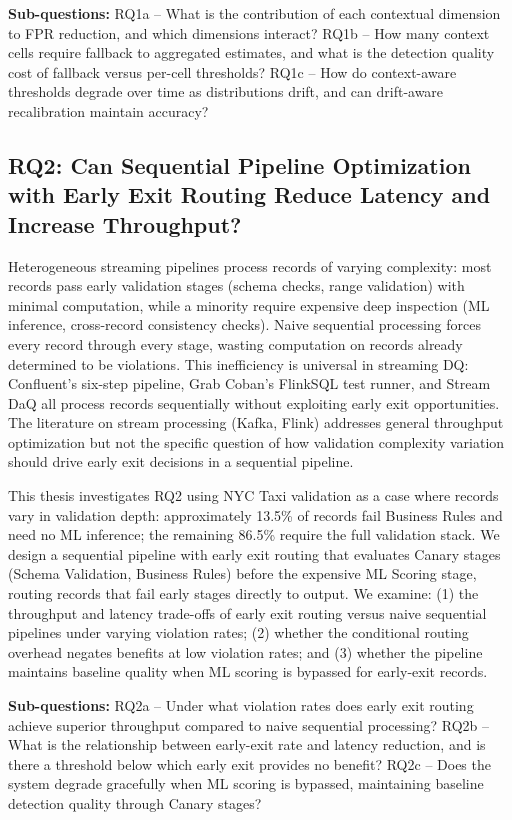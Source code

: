 \textbf{Sub-questions:} RQ1a -- What is the contribution of each contextual dimension to FPR reduction, and which dimensions interact? RQ1b -- How many context cells require fallback to aggregated estimates, and what is the detection quality cost of fallback versus per-cell thresholds? RQ1c -- How do context-aware thresholds degrade over time as distributions drift, and can drift-aware recalibration maintain accuracy?

\subsection{RQ2: Can Sequential Pipeline Optimization with Early Exit Routing Reduce Latency and Increase Throughput?}

Heterogeneous streaming pipelines process records of varying complexity: most records pass early validation stages (schema checks, range validation) with minimal computation, while a minority require expensive deep inspection (ML inference, cross-record consistency checks). Naive sequential processing forces every record through every stage, wasting computation on records already determined to be violations. This inefficiency is universal in streaming DQ: Confluent's six-step pipeline, Grab Coban's FlinkSQL test runner, and Stream DaQ all process records sequentially without exploiting early exit opportunities. The literature on stream processing (Kafka, Flink) addresses general throughput optimization but not the specific question of how validation complexity variation should drive early exit decisions in a sequential pipeline.

This thesis investigates RQ2 using NYC Taxi validation as a case where records vary in validation depth: approximately 13.5\% of records fail Business Rules and need no ML inference; the remaining 86.5\% require the full validation stack. We design a sequential pipeline with early exit routing that evaluates Canary stages (Schema Validation, Business Rules) before the expensive ML Scoring stage, routing records that fail early stages directly to output. We examine: (1) the throughput and latency trade-offs of early exit routing versus naive sequential pipelines under varying violation rates; (2) whether the conditional routing overhead negates benefits at low violation rates; and (3) whether the pipeline maintains baseline quality when ML scoring is bypassed for early-exit records.

\textbf{Sub-questions:} RQ2a -- Under what violation rates does early exit routing achieve superior throughput compared to naive sequential processing? RQ2b -- What is the relationship between early-exit rate and latency reduction, and is there a threshold below which early exit provides no benefit? RQ2c -- Does the system degrade gracefully when ML scoring is bypassed, maintaining baseline detection quality through Canary stages?


